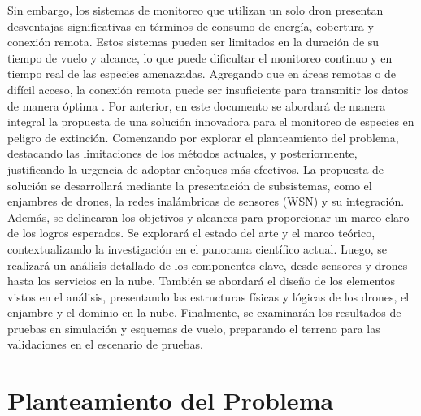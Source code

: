 Sin embargo, los sistemas de monitoreo que utilizan un solo dron presentan desventajas significativas en términos de consumo de energía, cobertura y conexión remota. Estos sistemas pueden ser limitados en la duración de su tiempo de vuelo y alcance, lo que puede dificultar el monitoreo continuo y en tiempo real de las especies amenazadas. Agregando que en áreas remotas o de difícil acceso, la conexión remota puede ser insuficiente para transmitir los datos de manera óptima \cite{8}.
Por anterior, en este documento se abordará de manera integral la propuesta de una solución innovadora para el monitoreo de especies en peligro de extinción. Comenzando por explorar el planteamiento del problema, destacando las limitaciones de los métodos actuales, y posteriormente, justificando la urgencia de adoptar enfoques más efectivos. La propuesta de solución se desarrollará mediante la presentación de subsistemas, como el enjambres de drones, la redes inalámbricas de sensores (WSN) y su integración. Además, se delinearan los objetivos y alcances para proporcionar un marco claro de los logros esperados. Se explorará el estado del arte y el marco teórico, contextualizando la investigación en el panorama científico actual. Luego, se realizará un análisis detallado de los componentes clave, desde sensores y drones hasta los servicios en la nube. También se abordará el diseño de los elementos vistos en el análisis, presentando las estructuras físicas y lógicas de los drones, el enjambre y el dominio en la nube. Finalmente, se examinarán los resultados de pruebas en simulación y esquemas de vuelo, preparando el terreno para las validaciones en el escenario de pruebas.

\chapter{Planteamiento del Problema}

